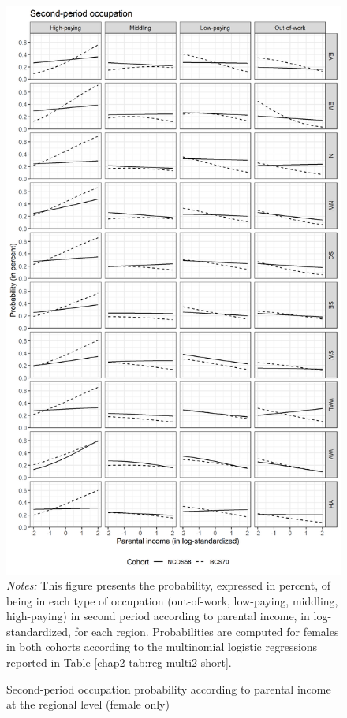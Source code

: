 \begin{figure}[!htb]
    \centering
    \caption{Second-period occupation probability according to parental income at the regional level (female only)}
    \label{chap2-fig:reg-multi2-pinc-female}
    \includegraphics[width=.7\linewidth]{chap2/graphic/reg-multi2-pinc-female.png}
    \vspace{-3em}
	\justify\singlespacing\footnotesize{\textit{Notes:} This figure presents the probability, expressed in percent, of being in each type of occupation (out-of-work, low-paying, middling, high-paying) in second period according to parental income, in log-standardized, for each region.
	Probabilities are computed for females in both cohorts according to the multinomial logistic regressions reported in Table \ref{chap2-tab:reg-multi2-short}.}
\end{figure}

